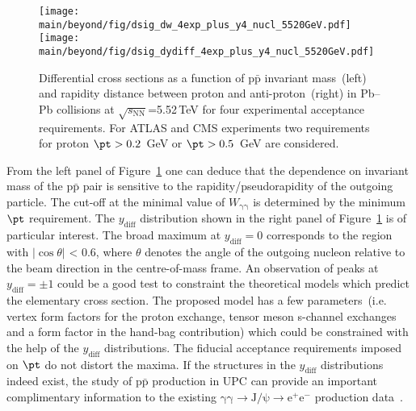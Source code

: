 \begin{figure}[!h]
        \texttt{[image: \\main/beyond/fig/dsig\_dw\_4exp\_plus\_y4\_nucl\_5520GeV.pdf]}
        \texttt{[image: \\main/beyond/fig/dsig\_dydiff\_4exp\_plus\_y4\_nucl\_5520GeV.pdf]}
        \caption{
                Differential cross sections as a function of $\mathrm{p\bar{p}}$
                invariant mass~(left) and rapidity
                distance between proton and anti-proton~(right)
                in Pb--Pb collisions at $\sqrt{s_{\mathrm{NN}}}$=5.52\,TeV
                for four experimental acceptance requirements. 
                For ATLAS and CMS experiments two requirements for proton $\pt>0.2$~GeV or $\pt>0.5$~GeV are considered.
        }
        \label{fig:ppbar}
\end{figure}


From the left panel of Figure~\ref{fig:ppbar} one can deduce that the dependence on invariant mass of the $\mathrm{p\bar{p}}$ pair is sensitive to the rapidity/pseudorapidity of the outgoing particle. The cut-off at the minimal value of $W_{\mathrm{\gamma\gamma}}$ is determined by the minimum $\pt$ requirement.
The $y_{\mathrm{diff}}$ distribution shown in the right panel of Figure~\ref{fig:ppbar} is of particular interest. 
The broad maximum at $y_{\mathrm{diff}}=0$ corresponds to the region with $|\cos \theta|$ < 0.6, where $\theta$ denotes the angle of the outgoing nucleon relative to the beam direction in the centre-of-mass frame.  
An observation of peaks at $y_{\mathrm{diff}} = \pm 1$ could be a good test to constraint the theoretical models which predict the elementary cross section. The proposed model has a few parameters~(i.e. vertex form factors for the proton exchange, tensor meson s-channel exchanges and a form factor in the hand-bag contribution) which could be constrained with the help of the $y_{\mathrm{diff}}$ distributions.
The fiducial acceptance requirements imposed on $\pt$ do not distort the maxima.
If the structures in the $y_{\mathrm{diff}}$ distributions indeed exist, the study of $\mathrm{p\bar{p}}$ production in UPC can provide an important complimentary information  to the existing $\mathrm{\gamma\gamma\rightarrow J/\psi \rightarrow e^+e^-}$ production data~\cite{Kryshen:2017jfz,Abbas:2013oua}.


